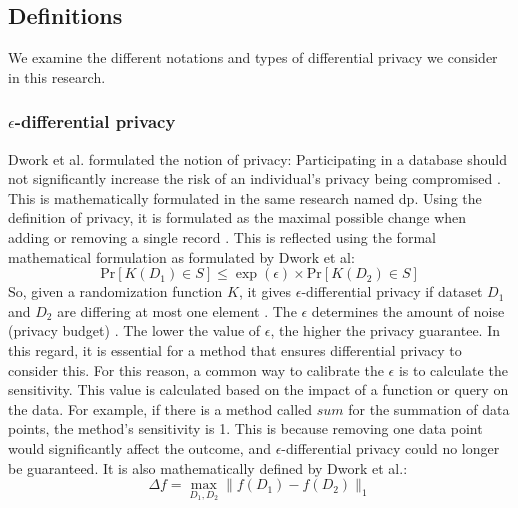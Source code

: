 \newpage
\subsection{Definitions}
We examine the different notations and types of differential privacy we consider in this research.

\subsubsection{$\epsilon$-differential privacy}
Dwork et al. formulated the notion of privacy: Participating in a database should not significantly increase the risk of an individual's privacy being compromised \cite{dwork_differential_2006}.
This is mathematically formulated in the same research named \gls{dp}.
Using the definition of privacy, it is formulated as the maximal possible change when adding or removing a single record \citep{dwork_differential_2006, friedman_data_2010}.
This is reflected using the formal mathematical formulation as formulated by Dwork et al:
\begin{equation}
  {\mathrm{Pr}}[K(D_{1})\in S]\leq\exp(\epsilon)\times{\mathrm{Pr}}[K(D_{2})\in S]
  \label{pure-dp}
\end{equation}
So, given a randomization function $K$, it gives $\epsilon$-differential privacy if dataset $D_1$ and $D_2$ are differing at most one element \citep{dwork_differential_2006}.
The $\epsilon$ determines the amount of noise (privacy budget) \citep{friedman_data_2010}.
The lower the value of $\epsilon$, the higher the privacy guarantee.
In this regard, it is essential for a method that ensures differential privacy to consider this.
For this reason, a common way to calibrate the $\epsilon$ is to calculate the sensitivity.
This value is calculated based on the impact of a function or query on the data.
For example, if there is a method called $sum$ for the summation of data points, the method's sensitivity is 1.
This is because removing one data point would significantly affect the outcome, and $\epsilon$-differential privacy could no longer be guaranteed.
It is also mathematically defined by Dwork et al.:
\begin{equation}
  \Delta f=\operatorname*{max}_{D_{1},D_{2}}\|f(D_{1})-f(D_{2})\|_{1}
  \label{sensitivity-dp}
\end{equation}
